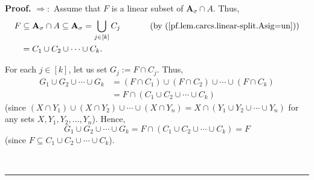 \documentclass[numbers=enddot,12pt,final,onecolumn,notitlepage]{scrartcl}%
\numberwithin{exer}{section}
\theoremstyle{definition}
\newenvironment{proof}[1][Proof]{\noindent\textbf{#1.} }{\ \rule{0.5em}{0.5em}}
\let\cupnonlimits\bigcup
\renewcommand{\bigcup}{\cupnonlimits\limits}
\newenvironment{verlong}{}{}
\begin{document}
\begin{verlong}
\begin{proof}
$\Longrightarrow:$ Assume that $F$ is a linear subset of $\mathbf{A}_{\sigma
}\cap A$. Thus,%
\begin{align*}
F  &  \subseteq\mathbf{A}_{\sigma}\cap A\subseteq\mathbf{A}_{\sigma}%
=\bigcup_{j\in\left[  k\right]  }C_{j}\ \ \ \ \ \ \ \ \ \ \left(  \text{by
(\ref{pf.lem.carcs.linear-split.Asig=un})}\right) \\
&  =C_{1}\cup C_{2}\cup\cdots\cup C_{k}.
\end{align*}


For each $j\in\left[  k\right]  $, let us set $G_{j}:=F\cap C_{j}$. Thus,%
\begin{align*}
G_{1}\cup G_{2}\cup\cdots\cup G_{k}  &  =\left(  F\cap C_{1}\right)
\cup\left(  F\cap C_{2}\right)  \cup\cdots\cup\left(  F\cap C_{k}\right) \\
&  =F\cap\left(  C_{1}\cup C_{2}\cup\cdots\cup C_{k}\right)
\end{align*}
(since $\left(  X\cap Y_{1}\right)  \cup\left(  X\cap Y_{2}\right)  \cup
\cdots\cup\left(  X\cap Y_{n}\right)  =X\cap\left(  Y_{1}\cup Y_{2}\cup
\cdots\cup Y_{n}\right)  $ for any sets $X,Y_{1},Y_{2},\ldots,Y_{n}$). Hence,%
\[
G_{1}\cup G_{2}\cup\cdots\cup G_{k}=F\cap\left(  C_{1}\cup C_{2}\cup\cdots\cup
C_{k}\right)  =F
\]
(since $F\subseteq C_{1}\cup C_{2}\cup\cdots\cup C_{k}$).


\end{proof}
\end{verlong}
\end{document}
